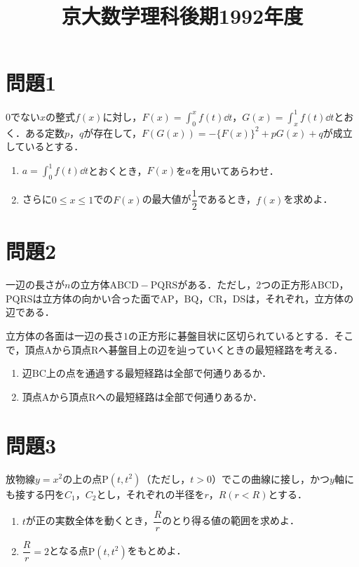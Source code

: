 \documentclass[unicode,12pt, A4j]{ltjsarticle}%
\title{京大数学理科後期1992年度}
\author{}
\date{}
\begin{document}
\maketitle

\section{問題1}
$0$でない$x$の整式$f(x)$に対し，${\displaystyle F(x)=\int_0^x f(t)\dd t }$，${\displaystyle G(x)=\int_x^1 f(t)\dd t }$とおく．ある定数$p$，$q$が存在して，$F(G(x))=-\{F(x)\}^2+pG(x)+q$が成立しているとする．
\begin{enumerate}
 \item ${\displaystyle a=\int_0^1 f(t)\dd t }$とおくとき，$F(x)$を$a$を用いてあらわせ．
 \item さらに$0\le x\le 1$での$F(x)$の最大値が$\dfrac{1}{2}$であるとき，$f(x)$を求めよ．
\end{enumerate}

\section{問題2}
一辺の長さが$n$の立方体$\mathrm{ABCD-PQRS}$がある．ただし，$2$つの正方形$\mathrm{ABCD}$，$\mathrm{PQRS}$は立方体の向かい合った面で$\mathrm{AP}$，$\mathrm{BQ}$，$\mathrm{CR}$，$\mathrm{DS}$は，それぞれ，立方体の辺である．

立方体の各面は一辺の長さ$1$の正方形に碁盤目状に区切られているとする．そこで，頂点$\mathrm{A}$から頂点$\mathrm{R}$へ碁盤目上の辺を辿っていくときの最短経路を考える．

\begin{enumerate}
 \item 辺$\mathrm{BC}$上の点を通過する最短経路は全部で何通りあるか．
 \item 頂点$\mathrm{A}$から頂点$\mathrm{R}$への最短経路は全部で何通りあるか．
\end{enumerate}

\section{問題3}
放物線$y=x^2$の上の点$\mathrm{P}(t,t^2)$（ただし，$t>0$）でこの曲線に接し，かつ$y$軸にも接する円を$C_1$，$C_2$とし，それぞれの半径を$r$，$R(r<R)$とする．
\begin{enumerate}
 \item $t$が正の実数全体を動くとき，$\dfrac{R}{r}$のとり得る値の範囲を求めよ．
 \item $\dfrac{R}{r}=2$となる点$\mathrm{P}(t,t^2)$をもとめよ．
\end{enumerate}
\end{document}
